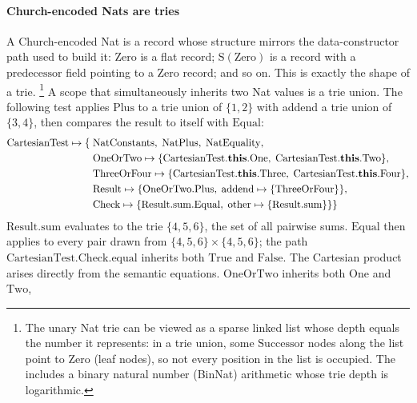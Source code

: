 \paragraph{Church-encoded Nats are tries}
\label{sec:case-study-cartesian}
A Church-encoded Nat is a record whose structure mirrors the
data-constructor path used to build it: $\mathrm{Zero}$ is a flat record;
$\mathrm{S}(\mathrm{Zero})$ is a record with a $\mathrm{predecessor}$
field pointing to a $\mathrm{Zero}$ record; and so on.
This is exactly the shape of a trie.%
\footnote{
  The unary Nat trie can be viewed as a sparse linked list
  whose depth equals the number it represents:
  in a trie union, some $\mathrm{Successor}$ nodes along
  the list point to $\mathrm{Zero}$ (leaf nodes),
  so not every position in the list is occupied.
  The includes a binary natural number
  (BinNat) arithmetic whose trie depth is logarithmic.
}
A scope that simultaneously inherits two Nat values is a trie union.
The following test applies $\mathrm{Plus}$ to a trie union of $\{1,2\}$
with addend a trie union of $\{3,4\}$, then compares the result to itself
with $\mathrm{Equal}$:
\begin{align*}
  \mathrm{CartesianTest} \mapsto \{\;&
    \mathrm{NatConstants},\; \mathrm{NatPlus},\; \mathrm{NatEquality},\\
    &\mathrm{OneOrTwo} \mapsto \{
      \mathrm{CartesianTest}.\mathbf{this}.\mathrm{One},\;
    \mathrm{CartesianTest}.\mathbf{this}.\mathrm{Two}\},\\
    &\mathrm{ThreeOrFour} \mapsto \{
      \mathrm{CartesianTest}.\mathbf{this}.\mathrm{Three},\;
    \mathrm{CartesianTest}.\mathbf{this}.\mathrm{Four}\},\\
    &\mathrm{Result} \mapsto \{
      \mathrm{OneOrTwo}.\mathrm{Plus},\;
    \mathrm{addend} \mapsto \{\mathrm{ThreeOrFour}\}\},\\
    &\mathrm{Check} \mapsto \{
      \mathrm{Result}.\mathrm{sum}.\mathrm{Equal},\;
  \mathrm{other} \mapsto \{\mathrm{Result}.\mathrm{sum}\}\}\}
\end{align*}
$\mathrm{Result}.\mathrm{sum}$ evaluates to the trie $\{4,5,6\}$, the set of all pairwise sums.
$\mathrm{Equal}$ then applies to every pair drawn from $\{4,5,6\} \times \{4,5,6\}$;
the path $\mathrm{CartesianTest}.\mathrm{Check}.\mathrm{equal}$
inherits both $\mathrm{True}$ and $\mathrm{False}$.
The Cartesian product arises directly from the semantic equations.
$\mathrm{OneOrTwo}$ inherits both $\mathrm{One}$ and $\mathrm{Two}$,

